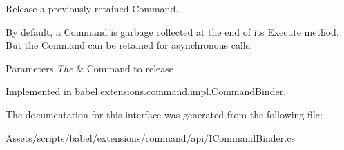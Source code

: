 Release a previously retained Command. 

By default, a Command is garbage collected at the end of its Execute method. But the Command can be retained for asynchronous calls.


\begin{DoxyParams}{Parameters}
{\em The} & Command to release \\
\hline
\end{DoxyParams}


Implemented in \hyperlink{classbabel_1_1extensions_1_1command_1_1impl_1_1_command_binder_a5f254fbeda04e19eabdd104458210087}{babel.\-extensions.\-command.\-impl.\-Command\-Binder}.



The documentation for this interface was generated from the following file\-:\begin{DoxyCompactItemize}
\item 
Assets/scripts/babel/extensions/command/api/I\-Command\-Binder.\-cs\end{DoxyCompactItemize}
